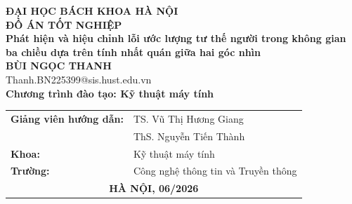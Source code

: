\documentclass[DoAn.tex]{subfiles}
\begin{document}
\begin{titlepage}
\thispagestyle{empty}

\begin{center}

{\textbf{\large{ĐẠI HỌC BÁCH KHOA HÀ NỘI}}}\\[3cm]

{\textbf{\huge{ĐỒ ÁN TỐT NGHIỆP}}}\\[0.8cm]

{\textbf{\Large{Phát hiện và hiệu chỉnh lỗi ước lượng tư thế người trong không gian ba chiều dựa trên tính nhất quán giữa hai góc nhìn}}}\\[0.8cm]

{\textbf{\large{BÙI NGỌC THANH}}}\\
{\large{Thanh.BN225399@sis.hust.edu.vn}}\\[0.4cm] 

{\textbf{\large{Chương trình đào tạo: Kỹ thuật máy tính}}}\\

\vspace{2cm}

\begin{table}[H]
\centering

\begin{tabular}{ll}

\multicolumn{1}{c}{\textbf{Giảng viên hướng dẫn:}}
& TS. Vũ Thị Hương Giang \hspace{0.5cm} \\[0.4cm]

& ThS. Nguyễn Tiến Thành \hspace{0.5cm} \\[0.4cm]

\multicolumn{1}{l}{\textbf{Khoa:}}
& Kỹ thuật máy tính \hspace{0.5cm} \\[0.4cm]

\multicolumn{1}{l}{\textbf{Trường:}}
& Công nghệ thông tin và Truyền thông \hspace{0.5cm} \\[3cm]

\multicolumn{2}{c}{\textbf{HÀ NỘI, 06/2026}}

\end{tabular}

\end{table}

\end{center}

\end{titlepage}
\end{document}
